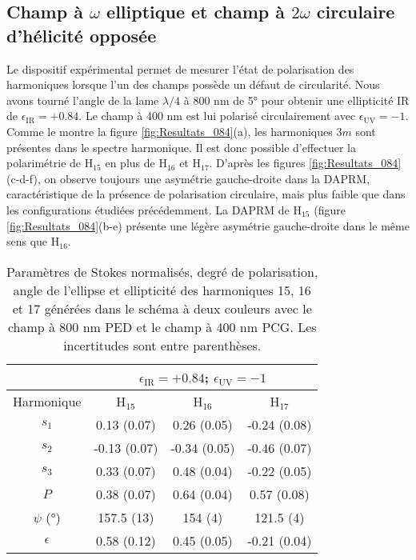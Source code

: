\subsection{Champ à $\omega$ elliptique et champ à $2\omega$ circulaire d'hélicité opposée}
Le dispositif expérimental permet de mesurer l'état de polarisation des harmoniques lorsque l'un des champs possède un défaut de circularité. Nous avons tourné l'angle de la lame $\lambda/4$ à 800 nm de 5° pour obtenir une ellipticité IR de $\epsilon_{\text{IR}} = +0.84$. Le champ à 400 nm est lui polarisé circulairement avec $\epsilon_{\text{UV}} = -1$. Comme le montre la figure \ref{fig:Resultats_084}(a), les harmoniques $3m$ sont présentes dans le spectre harmonique. Il est donc possible d'effectuer la polarimétrie de H$_{15}$ en plus de H$_{16}$ et H$_{17}$. D'après les figures \ref{fig:Resultats_084}(c-d-f), on observe toujours une asymétrie gauche-droite dans la DAPRM, caractéristique de la présence de polarisation circulaire, mais plus faible que dans les configurations étudiées précédemment. La DAPRM de H$_{15}$ (figure \ref{fig:Resultats_084}(b-e) présente une légère asymétrie gauche-droite dans le même sens que H$_{16}$.

\begin{table}[h]
\centering
\begin{tabular}{|c||c|c|c|}
\hline
 & \multicolumn{3}{c|}{$\epsilon_{\text{IR}} = +0.84$; $\epsilon_{\text{UV}} = -1$} \\
\hline
Harmonique & H$_{15}$ & H$_{16}$ & H$_{17}$ \\
\hline
$s_1$ & 0.13 (0.07) & 0.26 (0.05) & -0.24 (0.08) \\
\hline
$s_2$ & -0.13 (0.07) & -0.34 (0.05) & -0.46 (0.07)  \\
\hline
$s_3$ & 0.33 (0.07) & 0.48 (0.04) & -0.22 (0.05) \\
\hline
$P$ & 0.38 (0.07) & 0.64 (0.04) & 0.57 (0.08) \\
\hline
$\psi$ (°) & 157.5 (13) & 154 (4) & 121.5 (4) \\
\hline
$\epsilon$ & 0.58 (0.12) & 0.45 (0.05) & -0.21 (0.04) \\
\hline
\end{tabular}
\caption{Paramètres de Stokes normalisés, degré de polarisation, angle de l'ellipse et ellipticité des harmoniques 15, 16 et 17 générées dans le schéma à deux couleurs avec le champ à 800 nm PED et le champ à 400 nm PCG. Les incertitudes sont entre parenthèses.}
\label{tab:resultats084}
\end{table}

